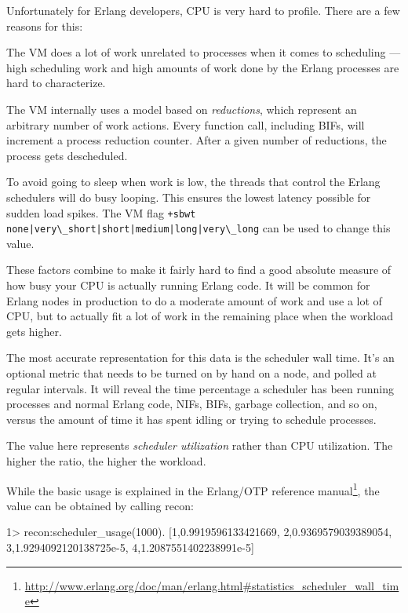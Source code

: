 \documentclass[11pt, oneside]{book}   	%
\newcommand{\command}[1]{\Verb`#1`}
\begin{document}
Unfortunately for Erlang developers, CPU is very hard to profile. There are a few reasons for this:

\begin{itemize*}
	\item The VM does a lot of work unrelated to processes when it comes to scheduling — high scheduling work and high amounts of work done by the Erlang processes are hard to characterize.
	\item The VM internally uses a model based on \emph{reductions}, which represent an arbitrary number of work actions. Every function call, including BIFs, will increment a process reduction counter. After a given number of reductions, the process gets descheduled.
	\item To avoid going to sleep when work is low, the threads that control the Erlang schedulers will do busy looping. This ensures the lowest latency possible for sudden load spikes. The VM flag \command{+sbwt none|very\_short|short|medium|long|very\_long} can be used to change this value.
\end{itemize*}

These factors combine to make it fairly hard to find a good absolute measure of how busy your CPU is actually running Erlang code. It will be common for Erlang nodes in production to do a moderate amount of work and use a lot of CPU, but to actually fit a lot of work in the remaining place when the workload gets higher.

The most accurate representation for this data is the scheduler wall time. It's an optional metric that needs to be turned on by hand on a node, and polled at regular intervals. It will reveal the time percentage a scheduler has been running processes and normal Erlang code, NIFs, BIFs, garbage collection, and so on, versus the amount of time it has spent idling or trying to schedule processes.

The value here represents \emph{scheduler utilization} rather than CPU utilization. The higher the ratio, the higher the workload.

While the basic usage is explained in the Erlang/OTP reference manual\footnote{\href{http://www.erlang.org/doc/man/erlang.html\#statistics\_scheduler\_wall\_time}{http://www.erlang.org/doc/man/erlang.html\#statistics\_scheduler\_wall\_time}}, the value can be obtained by calling recon:

\begin{VerbatimEshell}
1> recon:scheduler_usage(1000).
[{1,0.9919596133421669},
 {2,0.9369579039389054},
 {3,1.9294092120138725e-5},
 {4,1.2087551402238991e-5}]
\end{VerbatimEshell}
\end{document}
